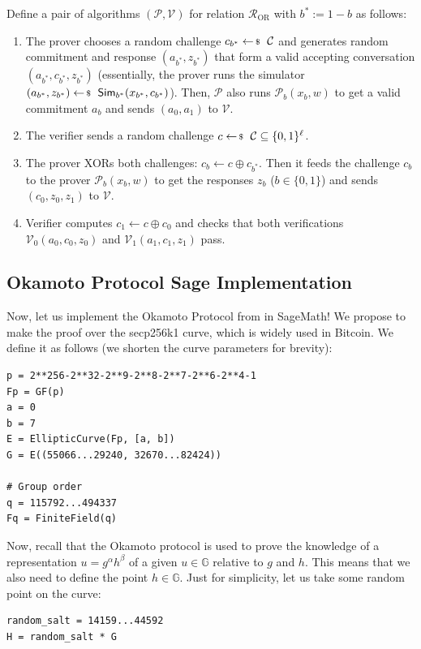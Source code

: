\documentclass[../../book.tex]{subfiles}
\begin{document}
\begin{definition}
    Define a pair of algorithms $(\mathcal{P},\mathcal{V})$ for relation $\mathcal{R}_{\text{OR}}$ with $b^* := 1-b$ as follows:
    \begin{enumerate}
        \item The prover chooses a random challenge $c_{b^*} \leftarrowS \mathcal{C}$ and generates random commitment and response $(a_{b^*}, z_{b^*})$ that form a valid accepting conversation $(a_{b^*}, c_{b^*}, z_{b^*})$ (essentially, the prover runs the simulator $(a_{b^*}, z_{b^*}) \leftarrowS \mathsf{Sim}_{b^*}(x_{b^*}, c_{b^*})$). Then, $\mathcal{P}$ also runs $\mathcal{P}_b(x_b, w)$ to get a valid commitment $a_b$ and sends $(a_0,a_1)$ to $\mathcal{V}$.
        \item The verifier sends a random challenge $c \leftarrowS \mathcal{C} \subseteq \{0,1\}^{\ell}$.
        \item The prover XORs both challenges: $c_b \gets c \oplus c_{b^*}$. Then it feeds the challenge $c_b$ to the prover $\mathcal{P}_b(x_b,w)$ to get the responses $z_b$ ($b \in \{0,1\}$) and sends $(c_0,z_0,z_1)$ to $\mathcal{V}$.
        \item Verifier computes $c_1 \gets c \oplus c_0$ and checks that both verifications $\mathcal{V}_0(a_0,c_0,z_0)$ and $\mathcal{V}_1(a_1,c_1,z_1)$ pass.
    \end{enumerate}
\end{definition}

\subsection{Okamoto Protocol Sage Implementation}

Now, let us implement the Okamoto Protocol from  in SageMath! We propose to make the proof 
over the secp256k1 curve, which is widely used in Bitcoin. We define it as follows (we shorten the curve parameters for brevity):
\begin{verbatim}
p = 2**256-2**32-2**9-2**8-2**7-2**6-2**4-1
Fp = GF(p)
a = 0
b = 7
E = EllipticCurve(Fp, [a, b])
G = E((55066...29240, 32670...82424))

# Group order
q = 115792...494337
Fq = FiniteField(q)
\end{verbatim}

Now, recall that the Okamoto protocol is used to prove the knowledge of a
representation $u=g^{\alpha}h^{\beta}$ of a given $u \in \mathbb{G}$ relative to
$g$ and $h$. This means that we also need to define the point $h \in \mathbb{G}$.
Just for simplicity, let us take some random point on the curve:
\begin{verbatim}
random_salt = 14159...44592
H = random_salt * G
\end{verbatim}
\end{document}
